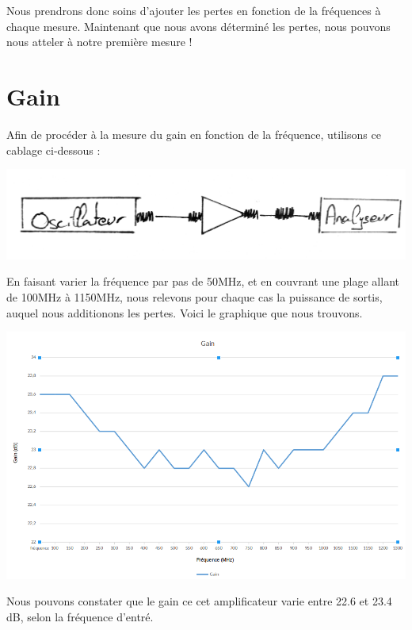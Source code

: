 \documentclass[a4paper,12pt]{report}            %
\begin{document}
Nous prendrons donc soins d'ajouter les pertes en fonction de la fréquences à chaque mesure.
Maintenant que nous avons déterminé les pertes, nous pouvons nous atteler à notre première mesure !


\section{Gain}

Afin de procéder à la mesure du gain en fonction de la fréquence, utilisons ce cablage ci-dessous :

\begin{center}\includegraphics[scale = 0.25]{pic/montage.png}\\ \end{center}

En faisant varier la fréquence par pas de 50MHz, et en couvrant une plage allant de 100MHz à 1150MHz, 
nous relevons pour chaque cas la puissance de sortis, auquel nous additionons les pertes. Voici le graphique
que nous trouvons.

\begin{center}\includegraphics[scale = 0.4]{pic/gain_frequence.png}\\ \end{center}

Nous pouvons constater que le gain ce cet amplificateur varie entre 22.6 et 23.4 dB, selon la
fréquence d'entré. 
\end{document}
